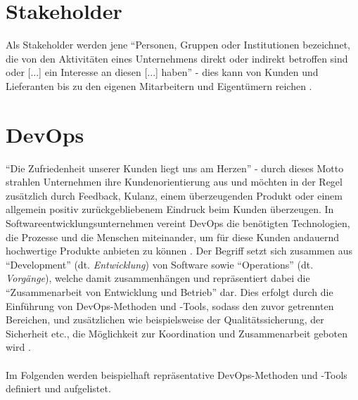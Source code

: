 \section{Stakeholder}
Als Stakeholder werden jene \enquote{Personen, Gruppen oder Institutionen bezeichnet, die von den Aktivitäten eines Unternehmens 
direkt oder indirekt betroffen sind oder [...] ein Interesse an diesen [...] haben} \cite{Fleig:2016aa} - dies kann von Kunden 
und Lieferanten bis zu den eigenen Mitarbeitern und Eigentümern reichen \cite{Fleig:2016aa}. 

\section{DevOps}
\enquote{Die Zufriedenheit unserer Kunden liegt uns am Herzen} - durch dieses Motto strahlen Unternehmen ihre Kundenorientierung aus und möchten in der Regel zusätzlich durch Feedback, Kulanz, einem überzeugenden Produkt
oder einem allgemein positiv zurückgebliebenem Eindruck beim Kunden überzeugen. In Softwareentwicklungsunternehmen vereint DevOps die benötigten Technologien, die Prozesse und die Menschen miteinander, um für diese Kunden 
andauernd hochwertige Produkte anbieten zu können \cite{MSAzure:2020aa}. Der Begriff setzt sich zusammen aus \enquote{Development} (dt. \textit{Entwicklung}) von Software sowie \enquote{Operations} (dt. \textit{Vorgänge}), welche damit zusammenhängen 
\cite{MSAzure:2020aa} und repräsentiert dabei die \enquote{Zusammenarbeit von Entwicklung und Betrieb} \cite{Hasselbring:2015aa} dar. Dies erfolgt durch die Einführung von DevOps-Methoden und -Tools, sodass den zuvor getrennten Bereichen, 
und zusätzlichen wie beispielsweise der Qualitätssicherung, der Sicherheit etc., die Möglichkeit zur Koordination und Zusammenarbeit geboten wird \cite{MSAzure:2020aa}. \\ \\
Im Folgenden werden beispielhaft repräsentative DevOps-Methoden und -Tools definiert und aufgelistet.

